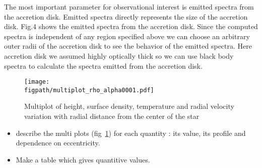 \documentclass[useAMS,usenatbib]{mn2e}
\newcommand{\figpath}{./Figs/}
\begin{document}
The most important parameter for observational interest is emitted spectra from the accretion disk. Emitted spectra directly represents the size of the accretion disk. Fig.4 shows the emitted spectra from the accretion disk. Since the computed spectra is independent of any region specified above we can choose an arbitrary outer radii of the accretion disk to see the behavior of the emitted spectra. Here accretion disk we assumed highly optically thick so we can use black body spectra to calculate the spectra emitted from the accretion disk. 
\begin{figure}
\centering
\texttt{[image: \\figpath/multiplot\_rho\_alpha0001.pdf]}
\caption{Multiplot of height, surface density, temperature and radial velocity variation with radial distance from the center of the star }
\label{fig:steadyplt1}
\end{figure}

\begin{itemize}
\item describe the multi plots (fig~\ref{fig:steadyplt1}) for each quantity : its value, its
  profile and dependence on eccentricity.
\item Make a table which gives quantitive values.  
\end{itemize}
\end{document}

